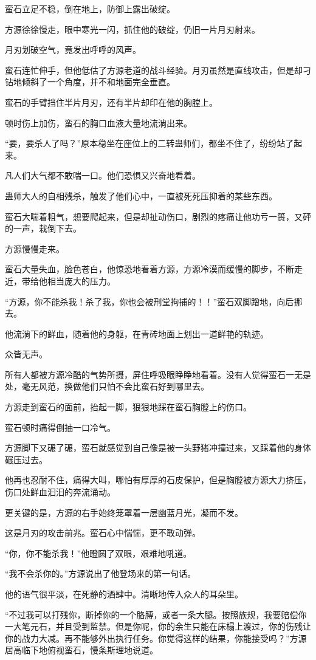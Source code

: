 \begin{this_body}
蛮石立足不稳，倒在地上，防御上露出破绽。

方源徐徐慢走，眼中寒光一闪，抓住他的破绽，仍旧一片月刃射来。

月刃划破空气，竟发出呼呼的风声。

蛮石连忙伸手，但他低估了方源老道的战斗经验。月刃虽然是直线攻击，但是却刁钻地倾斜了一个角度，并不和地面完全垂直。

蛮石的手臂挡住半片月刃，还有半片却印在他的胸膛上。

顿时伤上加伤，蛮石的胸口血液大量地流淌出来。

“要，要杀人了吗？”原本稳坐在座位上的二转蛊师们，都坐不住了，纷纷站了起来。

凡人们大气都不敢喘一口。他们恐惧又兴奋地看着。

蛊师大人的自相残杀，触发了他们心中，一直被死死压抑着的某些东西。

蛮石大喘着粗气，想要爬起来，但是却扯动伤口，剧烈的疼痛让他功亏一篑，又砰的一声，栽倒下去。

方源慢慢走来。

蛮石大量失血，脸色苍白，他惊恐地看着方源，方源冷漠而缓慢的脚步，不断走近，带给他相当庞大的压力。

“方源，你不能杀我！杀了我，你也会被刑堂拘捕的！！”蛮石双脚蹭地，向后挪去。

他流淌下的鲜血，随着他的身躯，在青砖地面上划出一道鲜艳的轨迹。

众皆无声。

所有人都被方源冷酷的气势所摄，屏住呼吸眼睁睁地看着。没有人觉得蛮石一无是处，毫无风范，换做他们只怕不会比蛮石好到哪里去。

方源走到蛮石的面前，抬起一脚，狠狠地踩在蛮石胸膛上的伤口。

蛮石顿时痛得倒抽一口冷气。

方源脚下又碾了碾，蛮石就感觉到自己像是被一头野猪冲撞过来，又踩着他的身体碾压过去。

他再也忍耐不住，痛得大叫，哪怕有厚厚的石皮保护，但是胸膛被方源大力挤压，伤口处鲜血汩汩的奔流涌动。

更关键的是，方源的右手始终笼罩着一层幽蓝月光，凝而不发。

这是月刃的攻击前兆。蛮石心中惴惴，更不敢动弹。

“你，你不能杀我！”他瞪圆了双眼，艰难地吼道。

“我不会杀你的。”方源说出了他登场来的第一句话。

他的语气很平淡，在死静的酒肆中。清晰地传入众人的耳朵里。

“不过我可以打残你，断掉你的一个胳膊，或者一条大腿。按照族规，我要赔偿你一大笔元石，并且受到监禁。但是你呢，你的余生只能在床榻上渡过，你的伤残让你的战力大减。再不能够外出执行任务。你觉得这样的结果，你能接受吗？”方源居高临下地俯视蛮石，慢条斯理地说道。


\end{this_body}
